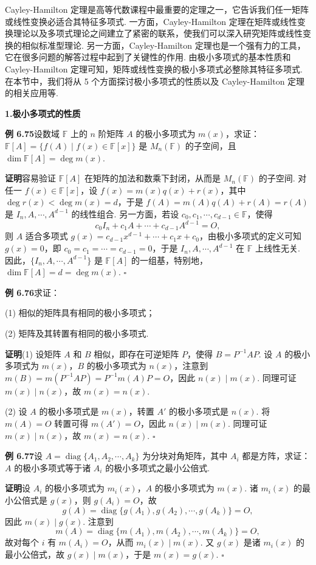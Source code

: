 \documentclass[UTF8,12pt,a4paper,fontset=fandol]{ctexart}
\begin{document}
Cayley-Hamilton 定理是高等代数课程中最重要的定理之一，它告诉我们任一矩阵或线性变换必适合其特征多项式. 一方面，Cayley-Hamilton 定理在矩阵或线性变换理论以及多项式理论之间建立了紧密的联系，使我们可以深入研究矩阵或线性变换的相似标准型理论. 另一方面，Cayley-Hamilton 定理也是一个强有力的工具，它在很多问题的解答过程中起到了关键性的作用. 由极小多项式的基本性质和 Cayley-Hamilton 定理可知，矩阵或线性变换的极小多项式必整除其特征多项式. 在本节中，我们将从 5 个方面探讨极小多项式的性质以及 Cayley-Hamilton 定理的相关应用等.

\noindent\textbf{1.\quad 极小多项式的性质}

\noindent\textbf{例 6.75}\quad 设数域 $\mathbb{F}$ 上的 $n$ 阶矩阵 $A$ 的极小多项式为 $m(x)$，求证：$\mathbb{F}[A]=\{f(A)\mid f(x)\in\mathbb{F}[x]\}$ 是 $M_n(\mathbb{F})$ 的子空间，且 $\dim\mathbb{F}[A]=\deg m(x)$.

\noindent\textbf{证明}\quad 容易验证 $\mathbb{F}[A]$ 在矩阵的加法和数乘下封闭，从而是 $M_n(\mathbb{F})$ 的子空间. 对任一 $f(x)\in\mathbb{F}[x]$，设 $f(x)=m(x)q(x)+r(x)$，其中 $\deg r(x)<\deg m(x)=d$，于是 $f(A)=m(A)q(A)+r(A)=r(A)$ 是 $I_n,A,\cdots,A^{d-1}$ 的线性组合. 另一方面，若设 $c_0,c_1,\cdots,c_{d-1}\in\mathbb{F}$，使得
\[
c_0I_n+c_1A+\cdots+c_{d-1}A^{d-1}=O,
\]
则 $A$ 适合多项式 $g(x)=c_{d-1}x^{d-1}+\cdots+c_1x+c_0$，由极小多项式的定义可知 $g(x)=0$，即 $c_0=c_1=\cdots=c_{d-1}=0$，于是 $I_n,A,\cdots,A^{d-1}$ 在 $\mathbb{F}$ 上线性无关. 因此，$\{I_n,A,\cdots,A^{d-1}\}$ 是 $\mathbb{F}[A]$ 的一组基，特别地，$\dim\mathbb{F}[A]=d=\deg m(x)$. $\square$

\noindent\textbf{例 6.76}\quad 求证：

(1) 相似的矩阵具有相同的极小多项式；

(2) 矩阵及其转置有相同的极小多项式.

\noindent\textbf{证明}\quad (1) 设矩阵 $A$ 和 $B$ 相似，即存在可逆矩阵 $P$，使得 $B=P^{-1}AP$. 设 $A$ 的极小多项式为 $m(x)$，$B$ 的极小多项式为 $n(x)$，注意到 $m(B)=m(P^{-1}AP)=P^{-1}m(A)P=O$，因此 $n(x)\mid m(x)$. 同理可证 $m(x)\mid n(x)$，故 $m(x)=n(x)$.

(2) 设 $A$ 的极小多项式是 $m(x)$，转置 $A'$ 的极小多项式是 $n(x)$. 将 $m(A)=O$ 转置可得 $m(A')=O$，因此 $n(x)\mid m(x)$. 同理可证 $m(x)\mid n(x)$，故 $m(x)=n(x)$. $\square$

\noindent\textbf{例 6.77}\quad 设 $A=\operatorname{diag}\{A_1,A_2,\cdots,A_k\}$ 为分块对角矩阵，其中 $A_i$ 都是方阵，求证：$A$ 的极小多项式等于诸 $A_i$ 的极小多项式之最小公倍式.

\noindent\textbf{证明}\quad 设 $A_i$ 的极小多项式为 $m_i(x)$，$A$ 的极小多项式为 $m(x)$. 诸 $m_i(x)$ 的最小公倍式是 $g(x)$，则 $g(A_i)=O$，故
\[
g(A)=\operatorname{diag}\{g(A_1),g(A_2),\cdots,g(A_k)\}=O,
\]
因此 $m(x)\mid g(x)$. 注意到
\[
m(A)=\operatorname{diag}\{m(A_1),m(A_2),\cdots,m(A_k)\}=O,
\]
故对每个 $i$ 有 $m(A_i)=O$，从而 $m_i(x)\mid m(x)$. 又 $g(x)$ 是诸 $m_i(x)$ 的最小公倍式，故 $g(x)\mid m(x)$，于是 $m(x)=g(x)$. $\square$
\end{document}
